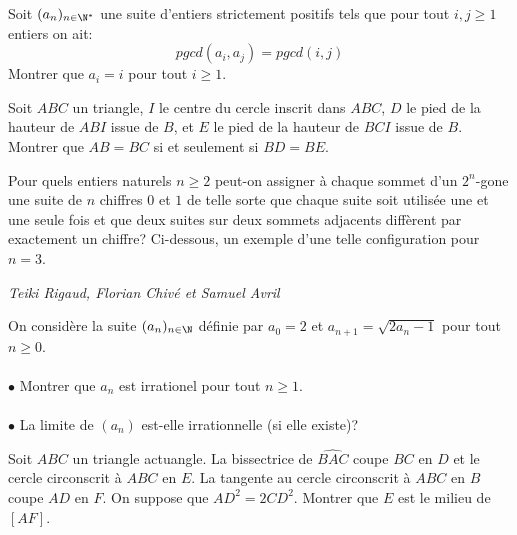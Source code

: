 \begin{exo}{}
Soit $(a_n)_{n\in \N^*}$ une suite d'entiers strictement positifs tels que pour tout $i,j\ge 1$ entiers on ait:
$$pgcd(a_i,a_j)=pgcd(i,j)$$
Montrer que $a_i=i$ pour tout $i\ge 1$.
\end{exo}

\begin{exo}{}
Soit $ABC$ un triangle, $I$ le centre du cercle inscrit dans $ABC$, $D$ le pied de la hauteur de $ABI$ issue de $B$,
et $E$ le pied de la hauteur de $BCI$ issue de $B$.
Montrer que $AB = BC$ si et seulement si $BD = BE$.
\end{exo}

\begin{exo}{}
Pour quels entiers naturels $n\geq2$ peut-on assigner à chaque sommet d'un $2^n$-gone une suite de $n$ chiffres $0$ et $1$ de telle sorte que chaque suite soit utilisée une et une seule fois et que deux suites sur deux sommets adjacents diffèrent par exactement un chiffre? Ci-dessous, un exemple d'une telle configuration pour $n=3$.
\begin{center}
\end{center}

\medskip
\textit{Teiki Rigaud, Florian Chivé et Samuel Avril}
\end{exo}

\begin{exo}{}
On considère la suite $(a_n)_{n\in \N}$ définie par $a_0=2$ et $a_{n+1}=\sqrt{2a_n-1}$ pour tout $n\ge 0$.\\~~\\
$\bullet$ Montrer que $a_n$ est irrationel pour tout $n\ge 1$.\\~~\\
$\bullet$ La limite de $(a_n)$ est-elle irrationnelle (si elle existe)?
\end{exo}



\begin{exo}{}
Soit $ABC$ un triangle actuangle. La bissectrice de $\widehat{BAC}$ coupe $BC$ en $D$ et le cercle circonscrit à $ABC$ en $E$. La tangente au cercle circonscrit à $ABC$ en $B$ coupe $AD$ en $F$. On suppose que $AD^2=2CD^2$. Montrer que $E$ est le milieu de $[AF]$.
 \end{exo}
 
